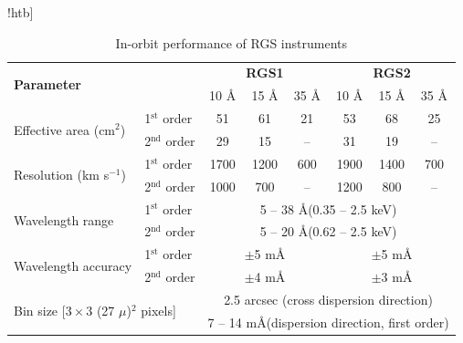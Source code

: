 			
		\begin{table}!htb]
			\centering
			\caption{In-orbit performance of RGS instruments}
			\label{xmm-rgs-performance}
			\begin{tabular}{l|l|ccc|ccc}
				\hline
				\multicolumn{2}{l|}{\multirow{2}{*}{\textbf{Parameter}}} & \multicolumn{3}{c|}{\textbf{RGS1}} & \multicolumn{3}{c}{\textbf{RGS2}} \\ \cline{3-8}
				\multicolumn{2}{l|}{} & {10 \AA} & {15 \AA} & {35 \AA} & {10 \AA} & {15 \AA} & {35 \AA} \\ \hline
				\multirow{2}{*}{Effective area (cm$^2$)} & {1$^\text{st}$ order} & {51} & {61} & {21} & {53} & {68} & {25} \\ %
														 & {2$^\text{nd}$ order} & {29} & {15} & {--} & {31} & {19} & {--} \\ \hline
				\multirow{2}{*}{Resolution (km s$^{-1}$)}& {1$^\text{st}$ order} & {1700} & {1200} & {600} & {1900} & {1400} & {700} \\ %
														 & {2$^\text{nd}$ order} & {1000} & {700} & {--} & {1200} & {800} & {--} \\ \hline
				\multirow{2}{*}{Wavelength range} & {1$^\text{st}$ order} & \multicolumn{6}{c}{5 -- 38 \AA (0.35 -- 2.5 keV)} \\ %
												   & {2$^\text{nd}$ order} & \multicolumn{6}{c}{5 -- 20 \AA (0.62 -- 2.5 keV)} \\ \hline
				\multirow{2}{*}{Wavelength accuracy} & {1$^\text{st}$ order} & \multicolumn{3}{c}{$\pm$5 m\AA} & \multicolumn{3}{c}{$\pm$5 m\AA} \\ %
                                                  	  & {2$^\text{nd}$ order} & \multicolumn{3}{c}{$\pm$4 m\AA} & \multicolumn{3}{c}{$\pm$3 m\AA} \\ \hline
				\multicolumn{2}{l|}{\multirow{2}{*}{Bin size {[}$3\times 3$ (27 $\mu$)$^2$ pixels{]}}} & \multicolumn{6}{c}{2.5 arcsec (cross dispersion direction)} \\ %
				\multicolumn{2}{l|}{} & \multicolumn{6}{c}{7 -- 14 m\AA (dispersion direction, first order)} \\ \hline
			\end{tabular}
		\end{table}
		
